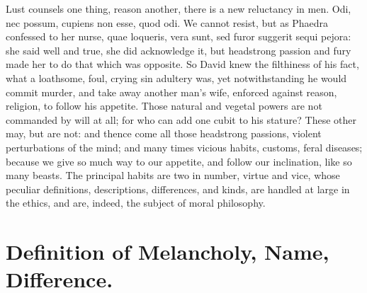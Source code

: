 {Lust counsels one thing, reason another, there is a new reluctancy in
men. Odi, nec possum, cupiens non esse, quod odi. We cannot
resist, but as Phaedra confessed to her nurse, quae loqueris,
vera sunt, sed furor suggerit sequi pejora: she said well and true, she
did acknowledge it, but headstrong passion and fury made her to do that
which was opposite. So David knew the filthiness of his fact, what a
loathsome, foul, crying sin adultery was, yet notwithstanding he would
commit murder, and take away another man's wife, enforced against
reason, religion, to follow his appetite.
Those natural and vegetal powers are not commanded by will at all; for
who can add one cubit to his stature? These other may, but are not: and
thence come all those headstrong passions, violent perturbations of the
mind; and many times vicious habits, customs, feral diseases; because
we give so much way to our appetite, and follow our inclination, like
so many beasts. The principal habits are two in number, virtue and
vice, whose peculiar definitions, descriptions, differences, and kinds,
are handled at large in the ethics, and are, indeed, the subject of
moral philosophy.


\section{Definition of Melancholy, Name, Difference.}

}
